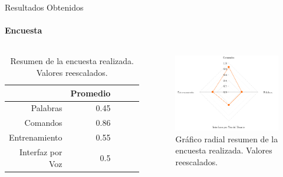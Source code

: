 \begin{frame}{Resultados Obtenidos}
\framesubtitle{Encuesta}
\begin{columns}
\begin{table}[H] 
\centering
\tiny
\begin{tabular}{|r|r|r|r|r|}
\hline
            & Promedio \\
\hline
Palabras    & 0.45 \\
Comandos    & 0.86 \\
Entrenamiento  & 0.55 \\
Interfaz por Voz & 0.5 \\
\hline
\end{tabular}
\caption{Resumen de la encuesta realizada. Valores reescalados.}
\label{sec:tabla-encuesta-normalizada}
\end{table}
\begin{figure}[ht]
\centering
\includegraphics[width=1\linewidth]{./graphics/kiviat.png}
\caption{Gr\'afico radial resumen de la encuesta realizada. Valores reescalados.}
\label{figure:kiviat-encuesta2}
\end{figure}
\end{columns}
\end{frame}